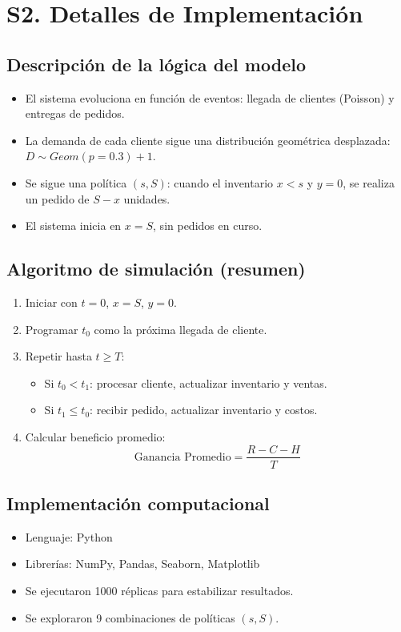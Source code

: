 \documentclass{report}
\begin{document}
\section*{S2. Detalles de Implementación}

\subsection*{Descripción de la lógica del modelo}

\begin{itemize}
\item El sistema evoluciona en función de eventos: llegada de clientes (Poisson) y entregas de pedidos.
\item La demanda de cada cliente sigue una distribución geométrica desplazada: \(D \sim Geom(p=0.3)+1\).
\item Se sigue una política \((s, S)\): cuando el inventario \(x < s\) y \(y = 0\), se realiza un pedido de \(S - x\) unidades.
\item El sistema inicia en \(x = S\), sin pedidos en curso.
\end{itemize}

\subsection*{Algoritmo de simulación (resumen)}

\begin{enumerate}
\item Iniciar con \(t=0\), \(x=S\), \(y=0\).
\item Programar \(t_0\) como la próxima llegada de cliente.
\item Repetir hasta \(t \geq T\):
  \begin{itemize}
  \item Si \(t_0 < t_1\): procesar cliente, actualizar inventario y ventas.
  \item Si \(t_1 \leq t_0\): recibir pedido, actualizar inventario y costos.
  \end{itemize}
\item Calcular beneficio promedio: \[ \text{Ganancia Promedio} = \frac{R - C - H}{T} \]
\end{enumerate}

\subsection*{Implementación computacional}

\begin{itemize}
\item Lenguaje: Python
\item Librerías: NumPy, Pandas, Seaborn, Matplotlib
\item Se ejecutaron 1000 réplicas para estabilizar resultados.
\item Se exploraron 9 combinaciones de políticas \((s, S)\).
\end{itemize}
\end{document}
